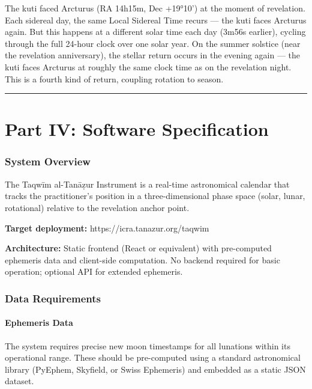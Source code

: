 The kuti faced Arcturus (RA 14h15m, Dec +19°10') at the moment of revelation. Each sidereal day, the same Local Sidereal Time recurs --- the kuti faces Arcturus again. But this happens at a different solar time each day (3m56s earlier), cycling through the full 24-hour clock over one solar year. On the summer solstice (near the revelation anniversary), the stellar return occurs in the evening again --- the kuti faces Arcturus at roughly the same clock time as on the revelation night. This is a fourth kind of return, coupling rotation to season.

\begin{center}\rule{0.5\linewidth}{0.5pt}\end{center}

\hypertarget{part-iv-software-specification}{%
\part{Part IV: Software Specification}\label{part-iv-software-specification}}

\hypertarget{system-overview}{%
\section{System Overview}\label{system-overview}}

The Taqwīm al-Tanāẓur Instrument is a real-time astronomical calendar that tracks the practitioner's position in a three-dimensional phase space (solar, lunar, rotational) relative to the revelation anchor point.

\textbf{Target deployment:} https://icra.tanazur.org/taqwim

\textbf{Architecture:} Static frontend (React or equivalent) with pre-computed ephemeris data and client-side computation. No backend required for basic operation; optional API for extended ephemeris.

\hypertarget{data-requirements}{%
\section{Data Requirements}\label{data-requirements}}

\hypertarget{ephemeris-data}{%
\subsection{Ephemeris Data}\label{ephemeris-data}}

The system requires precise new moon timestamps for all lunations within its operational range. These should be pre-computed using a standard astronomical library (PyEphem, Skyfield, or Swiss Ephemeris) and embedded as a static JSON dataset.

